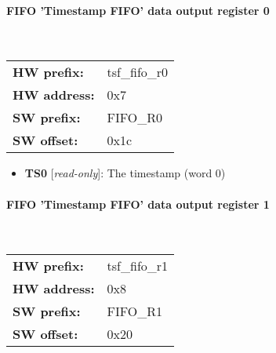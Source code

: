 \paragraph*{FIFO 'Timestamp FIFO' data output register 0}\mbox{}\\\vskip 6pt
\begin{tabular}{l l }
{\bf HW prefix:}  & tsf\_fifo\_r0\\
{\bf HW address:}  & 0x7\\
{\bf SW prefix:}  & FIFO\_R0\\
{\bf SW offset:}  & 0x1c\\
\end{tabular}


\vspace{12pt}
\noindent
{}

\begin{itemize}
\item \begin{small}
{\bf 
TS0
} [\emph{read-only}]: The timestamp (word 0)
\end{small}
\end{itemize}
\paragraph*{FIFO 'Timestamp FIFO' data output register 1}\mbox{}\\\vskip 6pt
\begin{tabular}{l l }
{\bf HW prefix:}  & tsf\_fifo\_r1\\
{\bf HW address:}  & 0x8\\
{\bf SW prefix:}  & FIFO\_R1\\
{\bf SW offset:}  & 0x20\\
\end{tabular}


